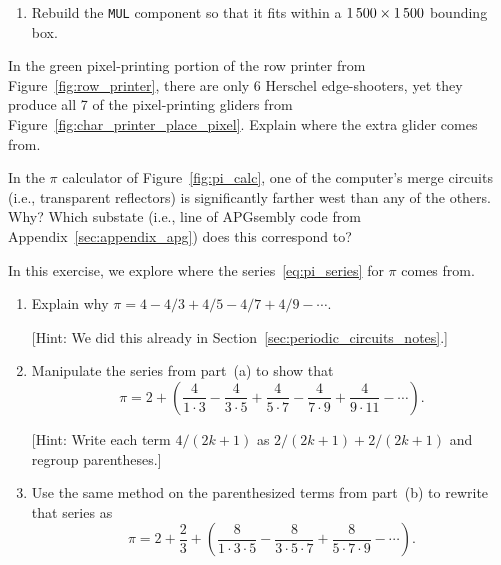 \begin{multicols}{2}
\begin{problem}
\begin{enumerate}[label=\bf\color{ocre}(\alph*)]
			\item Rebuild the \texttt{MUL} component so that it fits within a $1{\,}500 \times 1{\,}500$ bounding box.
		\end{enumerate}
	\end{problem}


	\mfilbreak
	
	
	\begin{problem}\label{exer:row_printer_six_not_seven} 
		In the green pixel-printing portion of the row printer from Figure~\ref{fig:row_printer}, there are only 6 Herschel edge-shooters, yet they produce all 7 of the pixel-printing gliders from Figure~\ref{fig:char_printer_place_pixel}. Explain where the extra glider comes from.
	\end{problem}


	\mfilbreak
	
	
	\begin{problemstar}\label{exer:pi_calc_distant_merge} 
		In the $\pi$ calculator of Figure~\ref{fig:pi_calc}, one of the computer's merge circuits (i.e., transparent reflectors) is significantly farther west than any of the others. Why? Which substate (i.e., line of APGsembly code from Appendix~\ref{sec:appendix_apg}) does this correspond to?
	\end{problemstar}
	
	
	\mfilbreak
	
	
	\begin{problemstar}\label{exer:universal_computation_derive_pi_series} 
		In this exercise, we explore where the series~\eqref{eq:pi_series} for $\pi$ comes from.\smallskip
		
		\begin{enumerate}[label=\bf\color{ocre}(\alph*)]
			\item Explain why $\pi = 4 - 4/3 + 4/5 - 4/7 + 4/9 - \cdots$.
			
			[Hint: We did this already in Section~\ref{sec:periodic_circuits_notes}.]
			
			\item Manipulate the series from part~(a) to show that
			\[
			\pi = 2 + \left(\frac{4}{1\cdot 3} - \frac{4}{3\cdot 5} + \frac{4}{5\cdot 7} - \frac{4}{7\cdot 9} + \frac{4}{9\cdot 11} - \cdots\right).
			\]
			
			[Hint: Write each term $4/(2k+1)$ as $2/(2k+1) + 2/(2k+1)$ and regroup parentheses.]
			
			\item Use the same method on the parenthesized terms from part~(b) to rewrite that series as
			\[
			\pi = 2 + \frac{2}{3} + \left(\frac{8}{1\cdot 3 \cdot 5} - \frac{8}{3\cdot 5 \cdot 7} + \frac{8}{5\cdot 7 \cdot 9} - \cdots\right).
			\]
			

\end{enumerate}
\end{problemstar}
\end{multicols}

